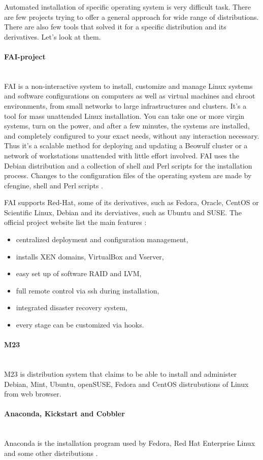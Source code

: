 \documentclass[thesis=B,english]{FITthesis}[2013/04/26]
\newcommand{\myparagraph}[1]{\paragraph{#1}\mbox{}\\}
\begin{document}
Automated installation of specific operating system is very difficult task. There are few projects trying to offer a general approach for wide range of distributions. There are also few tools that solved it for a specific distribution and its derivatives. Let's look at them.

\myparagraph{FAI-project}

FAI is a non-interactive system to install, customize and manage Linux
systems and software configurations on computers as well as virtual
machines and chroot environments, from small networks to large
infrastructures and clusters. It's a tool for mass unattended Linux
installation. You can take one or more virgin systems, turn on the
power, and after a few minutes, the systems are installed, and
completely configured to your exact needs, without any interaction
necessary. Thus it's a scalable method for deploying and updating a
Beowulf cluster or a network of workstations unattended with little
effort involved. FAI uses the Debian distribution and a collection of
shell and Perl scripts for the installation process. Changes to the
configuration files of the operating system are made by cfengine,
shell and Perl scripts \cite{fai_about}.

FAI supports Red-Hat, some of its derivatives, such as Fedora, Oracle, CentOS or Scientific Linux, Debian and its derviatives, such as Ubuntu and SUSE. The official project website list the main features \cite{fai_home}:

\begin{itemize}
	\item centralized deployment and configuration management,
	\item installs XEN domains, VirtualBox and Vserver,
	\item easy set up of software RAID and LVM,
	\item full remote control via ssh during installation,
	\item integrated disaster recovery system,
	\item every stage can be customized via hooks.
\end{itemize}

\myparagraph{M23}

M23 is distribution system that claims to be able to install and administer Debian, Mint, Ubuntu, openSUSE, Fedora and CentOS distrubutions of Linux from web browser. \cite{m23}

\myparagraph{Anaconda, Kickstart and Cobbler}

Anaconda is the installation program used by Fedora, Red Hat Enterprise Linux and some other distributions \cite{anaconda}.
\end{document}
